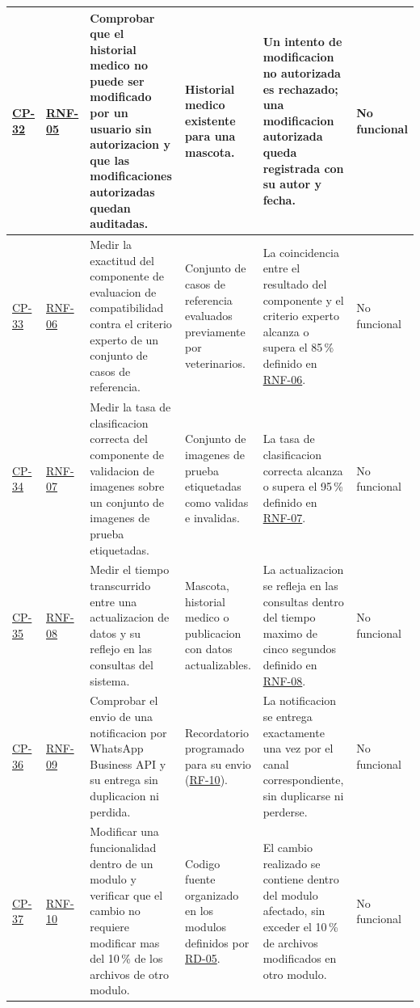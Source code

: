 \documentclass[journal,onecolumn]{IEEEtran}
\begin{document}
\begin{landscape}
\begin{longtable}{@{}p{1.3cm} p{1.3cm} p{4.6cm} p{3.6cm} p{5.2cm} p{1.6cm}@{}}
			\hyperref[cp:32]{CP-32}\label{cp:32} & \hyperref[tab:RNF-05]{RNF-05} & Comprobar que el historial medico no puede ser modificado por un usuario sin autorizacion y que las modificaciones autorizadas quedan auditadas. & Historial medico existente para una mascota. & Un intento de modificacion no autorizada es rechazado; una modificacion autorizada queda registrada con su autor y fecha. & No funcional \\ \midrule
			\hyperref[tab:CP-33]{CP-33} & \hyperref[tab:RNF-06]{RNF-06} & Medir la exactitud del componente de evaluacion de compatibilidad contra el criterio experto de un conjunto de casos de referencia. & Conjunto de casos de referencia evaluados previamente por veterinarios. & La coincidencia entre el resultado del componente y el criterio experto alcanza o supera el 85\,\% definido en \hyperref[tab:RNF-06]{RNF-06}. & No funcional \\ \midrule
			\hyperref[cp:34]{CP-34}\label{cp:34} & \hyperref[tab:RNF-07]{RNF-07} & Medir la tasa de clasificacion correcta del componente de validacion de imagenes sobre un conjunto de imagenes de prueba etiquetadas. & Conjunto de imagenes de prueba etiquetadas como validas e invalidas. & La tasa de clasificacion correcta alcanza o supera el 95\,\% definido en \hyperref[tab:RNF-07]{RNF-07}. & No funcional \\ \midrule
			\hyperref[cp:35]{CP-35}\label{cp:35} & \hyperref[tab:RNF-08]{RNF-08} & Medir el tiempo transcurrido entre una actualizacion de datos y su reflejo en las consultas del sistema. & Mascota, historial medico o publicacion con datos actualizables. & La actualizacion se refleja en las consultas dentro del tiempo maximo de cinco segundos definido en \hyperref[tab:RNF-08]{RNF-08}. & No funcional \\ \midrule
			\hyperref[cp:36]{CP-36}\label{cp:36} & \hyperref[tab:RNF-09]{RNF-09} & Comprobar el envio de una notificacion por WhatsApp Business API y su entrega sin duplicacion ni perdida. & Recordatorio programado para su envio (\hyperref[tab:RF-10]{RF-10}). & La notificacion se entrega exactamente una vez por el canal correspondiente, sin duplicarse ni perderse. & No funcional \\ \midrule
			\hyperref[cp:37]{CP-37}\label{cp:37} & \hyperref[tab:RNF-10]{RNF-10} & Modificar una funcionalidad dentro de un modulo y verificar que el cambio no requiere modificar mas del 10\,\% de los archivos de otro modulo. & Codigo fuente organizado en los modulos definidos por \hyperref[tab:RD-05]{RD-05}. & El cambio realizado se contiene dentro del modulo afectado, sin exceder el 10\,\% de archivos modificados en otro modulo. & No funcional \\ \midrule

\end{longtable}
\end{landscape}
\end{document}
